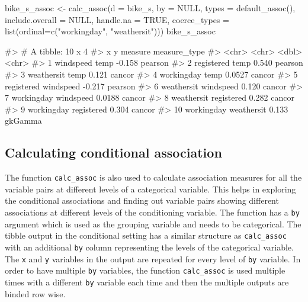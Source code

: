 \begin{Schunk}
\begin{Sinput}
bike_s_assoc <- calc_assoc(d = bike_s,
                           by = NULL,
                           types = default_assoc(),
                           include.overall = NULL,
                           handle.na = TRUE,
                           coerce_types = list(ordinal=c("workingday", "weathersit")))
bike_s_assoc
\end{Sinput}
\begin{Soutput}
#> # A tibble: 10 x 4
#>    x          y          measure measure_type
#>    <chr>      <chr>        <dbl> <chr>       
#>  1 windspeed  temp       -0.158  pearson     
#>  2 registered temp        0.540  pearson     
#>  3 weathersit temp        0.121  cancor      
#>  4 workingday temp        0.0527 cancor      
#>  5 registered windspeed  -0.217  pearson     
#>  6 weathersit windspeed   0.120  cancor      
#>  7 workingday windspeed   0.0188 cancor      
#>  8 weathersit registered  0.282  cancor      
#>  9 workingday registered  0.304  cancor      
#> 10 workingday weathersit  0.133  gkGamma
\end{Soutput}
\end{Schunk}

\hypertarget{calculating-conditional-association}{%
\subsection{Calculating conditional
association}\label{calculating-conditional-association}}

The function \texttt{calc\_assoc} is also used to calculate association
measures for all the variable pairs at different levels of a categorical
variable. This helps in exploring the conditional associations and
finding out variable pairs showing different associations at different
levels of the conditioning variable. The function has a \texttt{by}
argument which is used as the grouping variable and needs to be
categorical. The tibble output in the conditional setting has a similar
structure as \texttt{calc\_assoc} with an additional \texttt{by} column
representing the levels of the categorical variable. The \texttt{x} and
\texttt{y} variables in the output are repeated for every level of
\texttt{by} variable. In order to have multiple \texttt{by} variables,
the function \texttt{calc\_assoc} is used multiple times with a
different \texttt{by} variable each time and then the multiple outputs
are binded row wise.

